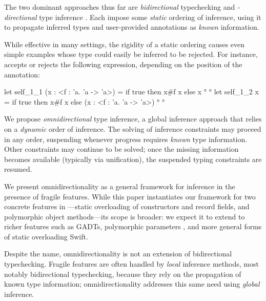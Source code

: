 \documentclass[acmsmall,screen,nonacm%
\Anonymous{,anonymous}{}%
\Final{}{,review}%
]{acmart}
\makeatletter
\newcommand{\BBpolyml}{Garrigue-Remy/poly-ml}
\newcommand{\BBpolyparams}{White/polyparams@ml2023}
\makeatother
\begin{document}

The two dominant approaches thus far are \emph{bidirectional} typechecking
\citep*{conf/popl/PierceT98} and \emph{\geninst-directional} type inference
\citep*{\BBpolyml}. Each impose some \emph{static} ordering of inference, using
it to propagate inferred types and user-provided annotations as \emph{known}
information.


While effective in many settings, the rigidity of a static ordering causes even
simple examples whose type could easily be inferred to be rejected. For
instance, \OCaml accepts or rejects the following expression, depending on the
position of the annotation:

\begin{program}
let self_1_1 (x : <f : 'a. 'a -> 'a>) = if true then x#f x else x °
°
let self_1_2 x = if true then x#f x else (x : <f : 'a. 'a -> 'a>) °
°
\end{program}



We propose \emph{omnidirectional} type inference, a global inference approach
that relies on a \emph{dynamic} order of inference. The solving of inference
constraints may proceed in any order, suspending whenever progress requires
\emph{known} type information. Other constraints may continue to be solved;
once the missing information becomes available (typically via unification), the
suspended typing constraints are resumed.


We present omnidirectionality as a general framework for inference in the
presence of fragile features. While this paper instantiates our framework for
two concrete features in \OCaml---static overloading of constructors and record
fields, and polymorphic object methods---its scope is broader: we expect it to
extend to richer features such as GADTs, polymorphic parameters
\citep{\BBpolyparams}, and more general forms of static overloading \ala Swift.

Despite the name, omnidirectionality is not an extension of bidirectional
typechecking. Fragile features are often handled by \emph{local} inference
methods, most notably bidirectional typechecking, because they rely on the
propagation of known type information; omnidirectionality addresses this same
need using \emph{global} inference.
\end{document}

